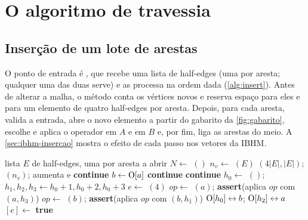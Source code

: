 \section{O algoritmo de travessia}
\label{sec:travessia}

\subsection{Inserção de um lote de arestas}

O ponto de entrada é , que recebe uma lista de half-edges (uma por aresta; qualquer uma
das duas serve) e as processa na ordem dada (\cref{alg:insert}). Antes de alterar a malha, o método conta os vértices
novos e reserva espaço para eles e para um elemento de quatro half-edges por aresta. Depois, para cada aresta, valida a
entrada, abre o novo elemento a partir do gabarito da \cref{fig:gabarito}, escolhe e aplica o operador em $A$ e em $B$
e, por fim, liga as arestas do meio. A \cref{sec:ibhm-insercao} mostra o efeito de cada passo nos vetores da IBHM.

\begin{algorithm}[ht]
\caption{$(E)$ \quad (classe )}
\label{alg:insert}
\begin{algorithmic}[1]
\Require lista $E$ de half-edges, uma por aresta a abrir
\State $N\gets$ $()$ 
\State $n_v\gets$ $(E)$
\State {}$(4|E|, |E|)$; $(n_v)$; aumenta
 e 
   \textbf{continue} 
  \EndIf
  \State $b\gets\mathrm{O}[a]$
   \textbf{continue} 
  \EndIf
   \textbf{continue} 
  \EndIf
  \State $h_0\gets$ $()$; \quad $h_1,h_2,h_3\gets h_0+1,h_0+2,h_0+3$
  \State $e\gets$ $(4)$ 
  \State $\mathit{op}\gets$ $(a)$; \textbf{assert}(aplica $\mathit{op}$ com $(a,h_3)$)
  \State $\mathit{op}\gets$ $(b)$; \textbf{assert}(aplica $\mathit{op}$ com $(b,h_1)$)
  \State $\mathrm{O}[h_0]\leftrightarrow b$; \quad $\mathrm{O}[h_2]\leftrightarrow a$ 
  \State {}$[e]\gets$ \textbf{true}
\EndFor
\end{algorithmic}
\end{algorithm}

